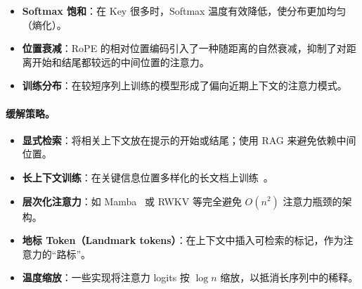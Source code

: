 \begin{itemize}
  \item \textbf{Softmax 饱和}：在 Key 很多时，Softmax 温度有效降低，使分布更加均匀（熵化）。
  \item \textbf{位置衰减}：RoPE 的相对位置编码引入了一种随距离的自然衰减，抑制了对距离开始和结尾都较远的中间位置的注意力。
  \item \textbf{训练分布}：在较短序列上训练的模型形成了偏向近期上下文的注意力模式。
\end{itemize}

\paragraph{缓解策略。}
\label{mitigation-strategies.}

\begin{itemize}
  \item \textbf{显式检索}：将相关上下文放在提示的开始或结尾；使用 RAG 来避免依赖中间位置。
  \item \textbf{长上下文训练}：在关键信息位置多样化的长文档上训练~\cite{fu2024data}。
  \item \textbf{层次化注意力}：如 Mamba~\cite{gu2024mamba} 或 RWKV 等完全避免 $O(n^2)$ 注意力瓶颈的架构。
  \item \textbf{地标 Token（Landmark tokens）}：在上下文中插入可检索的标记，作为注意力的``路标''。
  \item \textbf{温度缩放}：一些实现将注意力 logits 按 $\log n$ 缩放，以抵消长序列中的稀释。
\end{itemize}

